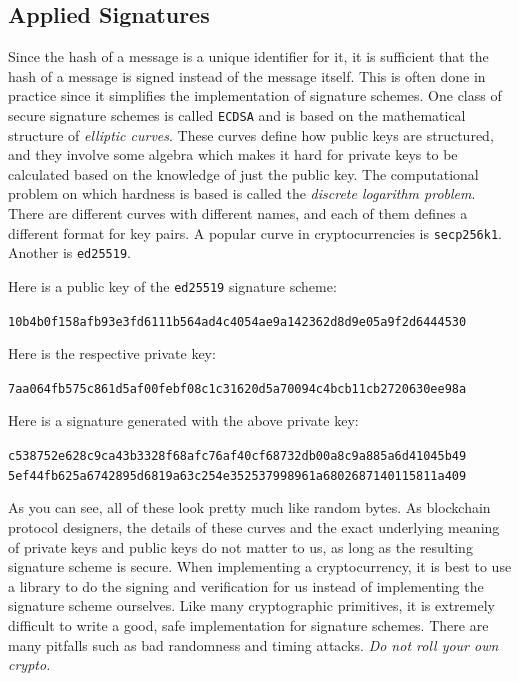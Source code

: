 \subsection*{Applied Signatures}

Since the hash of a message is a unique identifier for it, it is sufficient that
the hash of a message is signed instead of the message itself. This is often done
in practice since it simplifies the implementation of signature schemes.
One class of secure signature schemes is called
\texttt{ECDSA} and is based on the mathematical structure of \emph{elliptic curves}.
These curves define how public keys are structured, and they involve some algebra
which makes it hard for private keys to be calculated based on the knowledge of
just the public key. The computational problem on which hardness is based is called
the \emph{discrete logarithm problem}.
There are different curves with different names, and each of them
defines a different format for key pairs.
A popular curve in cryptocurrencies is
\texttt{secp256k1}. Another is \texttt{ed25519}.

Here is a public key of the \texttt{ed25519} signature scheme:

\texttt{10b4b0f158afb93e3fd6111b564ad4c4054ae9a142362d8d9e05a9f2d6444530}

Here is the respective private key:

\texttt{7aa064fb575c861d5af00febf08c1c31620d5a70094c4bcb11cb2720630ee98a}

Here is a signature generated with the above private key:

\texttt{c538752e628c9ca43b3328f68afc76af40cf68732db00a8c9a885a6d41045b49}\linebreak
\texttt{5ef44fb625a6742895d6819a63c254e352537998961a6802687140115811a409}

As you can see, all of these look pretty much like random bytes.
As blockchain protocol designers,
the details of these curves and the exact underlying meaning of private keys and public keys
do not matter to us, as long as the resulting signature
scheme is secure. When implementing a cryptocurrency, it is best to use a library
to do the signing and verification for us instead of implementing the signature
scheme ourselves. Like many cryptographic primitives, it is extremely difficult to
write a good, safe implementation for signature schemes. There are many pitfalls
such as bad randomness and timing attacks. \emph{Do not roll your own crypto.}

